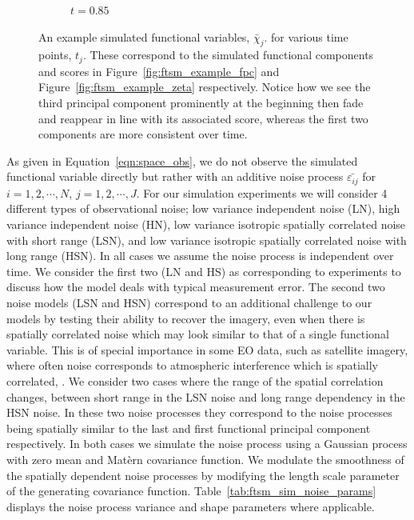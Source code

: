 \begin{figure}
\begin{subfigure}[b]{0.45\textwidth}
		\caption{$t=0.85$}
	\end{subfigure}
	\caption[An example of simulated functional variables at various times.]{An example simulated functional variables, $\bar{\chi}_j$. for various time points, $t_j$. These correspond to the simulated functional components and scores in Figure~\ref{fig:ftsm_example_fpc} and Figure~\ref{fig:ftsm_example_zeta} respectively. Notice how we see the third principal component prominently at the beginning then fade and reappear in line with its associated score, whereas the first two components are more consistent over time.}
	\label{fig:ftsm_chi_example}
\end{figure}

As given in Equation~\eqref{eqn:space_obs}, we do not observe the simulated functional variable directly but rather with an additive noise process $\bar{\varepsilon_{ij}}$ for $i=1,2,\cdots, N$, $j=1,2,\cdots, J$.
For our simulation experiments we will consider 4 different types of observational noise; low variance independent noise (LN), high variance independent noise (HN), low variance isotropic spatially correlated noise with short range (LSN), and low variance isotropic spatially correlated noise with long range (HSN).
In all cases we assume the noise process is independent over time. 
We consider the first two (LN and HS) as corresponding to experiments to discuss how the model deals with typical measurement error. 
The second two noise models (LSN and HSN) correspond to an additional challenge to our models by testing their ability to recover the imagery, even when there is spatially correlated noise which may look similar to that of a single functional variable. 
This is of special importance in some EO data, such as satellite imagery, where often noise corresponds to atmospheric interference which is spatially correlated, \citep{oliver_understanding_2004}. 
We consider two cases where the range of the spatial correlation changes, between short range in the LSN noise and long range
 dependency in the HSN noise. 
In these two noise processes they correspond to the noise processes being spatially similar to the last and first functional principal component respectively.
 In both cases we simulate the noise process using a Gaussian process with zero mean and  Mat\`{e}rn covariance function. 
 We modulate the smoothness of the spatially dependent noise processes by modifying  the length scale parameter of the generating covariance function.
 Table~\ref{tab:ftsm_sim_noise_params} displays the noise process variance and shape parameters where applicable. 
 
